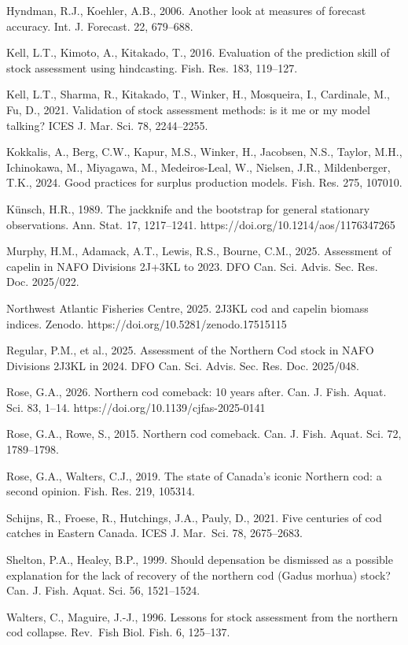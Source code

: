\documentclass[11pt]{article}
\begin{document}
Hyndman, R.J., Koehler, A.B., 2006. Another look at measures of forecast
accuracy. Int. J. Forecast. 22, 679--688.

Kell, L.T., Kimoto, A., Kitakado, T., 2016. Evaluation of the prediction
skill of stock assessment using hindcasting. Fish. Res. 183, 119--127.

Kell, L.T., Sharma, R., Kitakado, T., Winker, H., Mosqueira, I.,
Cardinale, M., Fu, D., 2021. Validation of stock assessment methods: is
it me or my model talking? ICES J. Mar. Sci. 78, 2244--2255.

Kokkalis, A., Berg, C.W., Kapur, M.S., Winker, H., Jacobsen, N.S.,
Taylor, M.H., Ichinokawa, M., Miyagawa, M., Medeiros-Leal, W., Nielsen,
J.R., Mildenberger, T.K., 2024. Good practices for surplus production
models. Fish. Res. 275, 107010.

K\"unsch, H.R., 1989. The jackknife and the bootstrap for general
stationary observations. Ann. Stat. 17, 1217--1241.
https://doi.org/10.1214/aos/1176347265

Murphy, H.M., Adamack, A.T., Lewis, R.S., Bourne, C.M., 2025. Assessment
of capelin in NAFO Divisions 2J+3KL to 2023. DFO Can. Sci. Advis. Sec.
Res. Doc. 2025/022.

Northwest Atlantic Fisheries Centre, 2025. 2J3KL cod and capelin biomass
indices. Zenodo. https://doi.org/10.5281/zenodo.17515115

Regular, P.M., et al., 2025. Assessment of the Northern Cod stock in
NAFO Divisions 2J3KL in 2024. DFO Can. Sci. Advis. Sec. Res. Doc.
2025/048.

Rose, G.A., 2026. Northern cod comeback: 10 years after. Can. J. Fish.
Aquat. Sci. 83, 1--14. https://doi.org/10.1139/cjfas-2025-0141

Rose, G.A., Rowe, S., 2015. Northern cod comeback. Can. J. Fish. Aquat.
Sci. 72, 1789--1798.

Rose, G.A., Walters, C.J., 2019. The state of Canada's iconic Northern
cod: a second opinion. Fish. Res. 219, 105314.

Schijns, R., Froese, R., Hutchings, J.A., Pauly, D., 2021. Five
centuries of cod catches in Eastern Canada. ICES J. Mar.~Sci. 78,
2675--2683.

Shelton, P.A., Healey, B.P., 1999. Should depensation be dismissed as a
possible explanation for the lack of recovery of the northern cod (Gadus
morhua) stock? Can. J. Fish. Aquat. Sci. 56, 1521--1524.

Walters, C., Maguire, J.-J., 1996. Lessons for stock assessment from the
northern cod collapse. Rev.~Fish Biol. Fish. 6, 125--137.
\end{document}
